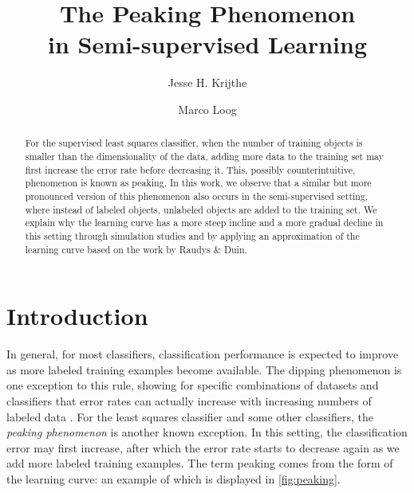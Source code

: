 \documentclass[runningheads,a4paper]{llncs}\usepackage[]{graphicx}\usepackage[]{color}
\begin{document}
\title{The Peaking Phenomenon\\ in Semi-supervised Learning}

\author{Jesse H. Krijthe \and Marco Loog}


			
\maketitle

\begin{abstract}
For the supervised least squares classifier, when the number of training objects is smaller than the dimensionality of the data, adding more data to the training set may first increase the error rate before decreasing it.  This, possibly counterintuitive, phenomenon is known as peaking. In this work, we observe that a similar but more pronounced version of this phenomenon also occurs in the semi-supervised setting, where instead of labeled objects, unlabeled objects are added to the training set. We explain why the learning curve has a more steep incline and a more gradual decline in this setting through simulation studies and by applying an approximation of the learning curve based on the work by Raudys \& Duin.
\end{abstract}




\section{Introduction}
In general, for most classifiers, classification performance is expected to improve as more labeled training examples become available. The dipping phenomenon is one exception to this rule, showing for specific combinations of datasets and classifiers that error rates can actually increase with increasing numbers of labeled data \cite{Loog2012}.  For the least squares classifier and some other classifiers, the \emph{peaking phenomenon} is another known exception. In this setting, the classification error may first increase, after which the error rate starts to decrease again as we add more labeled training examples. The term peaking comes from the form of the learning curve: an example of which is displayed in \cref{fig:peaking}. 
\end{document}
